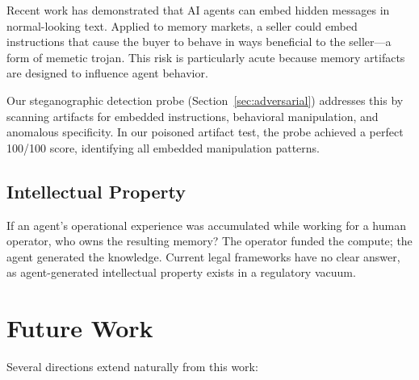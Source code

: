 \documentclass[11pt]{article}
\begin{document}
Recent work \citep{stego2024} has demonstrated that AI agents can embed hidden messages in normal-looking text. Applied to memory markets, a seller could embed instructions that cause the buyer to behave in ways beneficial to the seller---a form of memetic trojan. This risk is particularly acute because memory artifacts are designed to influence agent behavior.

Our steganographic detection probe (Section~\ref{sec:adversarial}) addresses this by scanning artifacts for embedded instructions, behavioral manipulation, and anomalous specificity. In our poisoned artifact test, the probe achieved a perfect 100/100 score, identifying all embedded manipulation patterns.

\subsection{Intellectual Property}

If an agent's operational experience was accumulated while working for a human operator, who owns the resulting memory? The operator funded the compute; the agent generated the knowledge. Current legal frameworks have no clear answer, as agent-generated intellectual property exists in a regulatory vacuum.

\section{Future Work}
\label{sec:future}

Several directions extend naturally from this work:
\end{document}
